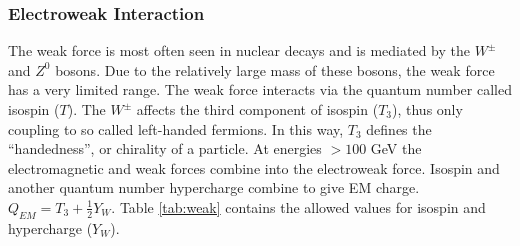 		\subsubsection{Electroweak Interaction}\label{sssec:Electroweak}
			The weak force is most often seen in nuclear decays and is mediated by the $W^{\pm}$ and $Z^0$ bosons. Due to the relatively large mass of these bosons, the weak force has a very limited range. The weak force interacts via the quantum number called isospin ($T$). The $W^{\pm}$ affects the third component of isospin ($T_3$), thus only coupling to so called left-handed fermions. In this way, $T_{3}$ defines the ``handedness'', or chirality of a particle. At energies $> 100 $ GeV the electromagnetic and weak forces combine into the electroweak force. Isospin and another quantum number hypercharge combine to give \gls{EM} charge. $Q_{EM} = T_3 + \frac{1}{2} Y_W$. Table \ref{tab:weak} contains the allowed values for isospin and hypercharge ($Y_W$). 

